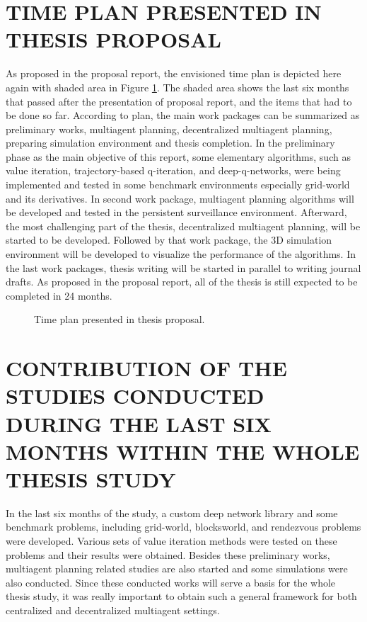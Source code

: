 \documentclass{ituphdreport}
\begin{document}
\section{TIME PLAN PRESENTED IN THESIS PROPOSAL}

As proposed in the proposal report, the envisioned time plan is depicted here again with shaded area in Figure \ref{fig:timeplan}. The shaded area shows the last six months that passed after the presentation of proposal report, and the items that had to be done so far. According to plan, the main work packages can be summarized as preliminary works, multiagent planning, decentralized multiagent planning, preparing simulation environment and thesis completion. In the preliminary phase as the main objective of this report, some elementary algorithms, such as value iteration, trajectory-based q-iteration, and deep-q-networks, were being implemented and tested in some benchmark environments especially grid-world and its derivatives. In second work package, multiagent planning algorithms will be developed and tested in the persistent surveillance environment. Afterward, the most challenging part of the thesis, decentralized multiagent planning, will be started to be developed. Followed by that work package, the 3D simulation environment will be developed to visualize the performance of the algorithms. In the last work packages, thesis writing will be started in parallel to writing journal drafts. As proposed in the proposal report, all of the thesis is still expected to be completed in 24 months.


\begin{figure}[h]
	\begin{center}
	\end{center}
	\caption{Time plan presented in thesis proposal.
		\label{fig:timeplan}}
\end{figure}

%


\section{CONTRIBUTION OF THE STUDIES CONDUCTED DURING THE LAST SIX  MONTHS WITHIN THE WHOLE THESIS STUDY}

In the last six months of the study, a custom deep network library and some benchmark problems, including grid-world, blocksworld, and rendezvous problems were developed. Various sets of value iteration methods were tested on these problems and their results were obtained. Besides these preliminary works, multiagent planning related studies are also started and some simulations were also conducted. Since these conducted works will serve a basis for the whole thesis study, it was really important to obtain such a general framework for both centralized and decentralized multiagent settings. 
\end{document}

